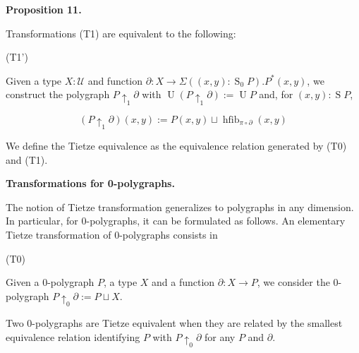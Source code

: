 \documentclass[10pt,a4paper]{amsart}
\begin{document}
 
 
\par\medskip\noindent\textbf{Proposition 11.}\par
 
 
Transformations (T1) are equivalent to the following:\par
  (T1’)  
 
Given a type $X:\mathcal{U}$ and function $\partial:X\to\Sigma((x,y):\operatorname{S}_{0}P).P^{*}(x,y)$, we construct the polygraph $P{\uparrow_{1}}\partial$ with $\operatorname{U}(P{\uparrow_{1}}\partial):=\operatorname{U}P$ and, for $(x,y):\operatorname{S}P$,\par
    \[(P{\uparrow_{1}}\partial)(x,y):=P(x,y)\sqcup\operatorname{hfib}_{\pi\circ\partial}(x,y)\]    
   
 
 
 
We define the Tietze equivalence as the equivalence relation generated by (T0) and (T1).\par
 
 
 
\par\medskip\noindent\textbf{Transformations for 0-polygraphs.}\par
 
 
The notion of Tietze transformation generalizes to polygraphs in any dimension. In particular, for 0-polygraphs, it can be formulated as follows. An elementary Tietze transformation of 0-polygraphs consists in\par
  (T0)  
 
Given a 0-polygraph $P$, a type $X$ and a function $\partial:X\to P$, we consider the 0-polygraph $P{\uparrow_{0}}\partial:=P\sqcup X$.\par
 
   
Two 0-polygraphs are Tietze equivalent when they are related by the smallest equivalence relation identifying $P$ with $P{\uparrow_{0}}\partial$ for any $P$ and $\partial$.\par
 
\end{document}
